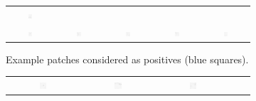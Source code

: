 \begin{figure}
\begin{subfigure}{\textwidth}
\begin{tabular}{c@{\,}c@{\,}c@{\,}c@{\,}c@{}}
			\includegraphics[width=0.1\textwidth]{fig01b10} \\
			\includegraphics[width=0.1\textwidth]{fig01b11} &
			\includegraphics[width=0.1\textwidth]{fig01b12} &
			\includegraphics[width=0.1\textwidth]{fig01b13} &
			\includegraphics[width=0.1\textwidth]{fig01b14} &
			\includegraphics[width=0.1\textwidth]{fig01b15}
		\end{tabular}
		\vspace{-0.5em}
		\caption{Example patches considered as positives (blue squares).}
		\vspace{1em}
	\end{subfigure}
	\begin{subfigure}{\textwidth}
		\centering
		\begin{tabular}{c@{\,}c@{\,}c@{\,}c@{\,}c@{}}
			\includegraphics[width=0.1\textwidth]{fig01c01} &
			\includegraphics[width=0.1\textwidth]{fig01c02} &
			\includegraphics[width=0.1\textwidth]{fig01c03} &

\end{tabular}
\end{subfigure}
\end{figure}
